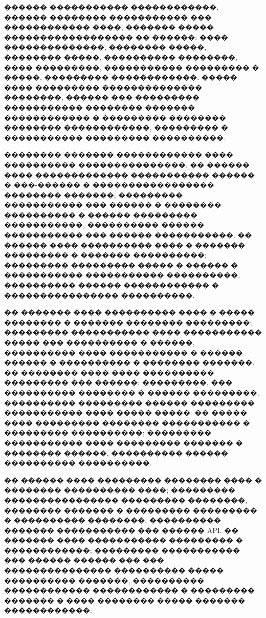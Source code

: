 ������ ����������� ������������. ������ �������� ����������� ��� ������������ ����, ������� ����� ������������������ �� ������: ���� ��������������, �������� �����, �������� �����, ���������� ��������, ���� ���������, ����������� ��������� � �����, ��������� ������������. ����� ���� ��������� �������������� ��������, ������ ��� ��������� ����������� �������� ������� ������������ � ��������� �������� �������� ������������, ��������� � ����������� ��������� ����������.

�������� ������� ������������ ���� ���������� ���������������. �� ������ ���� ������������� ����������� ������ � ���-������ � ����������������� �������� �������; ��������� ����������� ��� ������ � �������� ���������� � ������ ��������� �����������, ���������� ������ ����������� ��� ������ �����������. �� ������ ���� ���������� ���� � ������� ��������� � ������� ����������; ��������� ��������� ����� � ������ � ����������� ����������� ����������, ���������� ������ ������������ � ���������������� ����������.

�� ������� ���� ���������� ���� � ����� �������� � ������� �������� ���������; ��������� ����������� ���� ����������� ����� ��� ���������� � ������, ���������� ���� ����������� � ������ ������ � ���������� � �������� �������. �� �������� ���� ���� ���������� ��������� ��� ������; ���������, ��� ���������� �������� � ������ ���������, ���������� ��������� ������ ��������� ����������� ���� ����� �����. �� ����� ���� ��������� �������� ����������� � ��������� ����������; ��������� ����������� ���� ��������� ������� � �������� ������, ���������� ������ ���������� ����������.

�� ������ ���� ��������� �������� ���� � �������� ���������� ����; ��������� ���������������� ��������� ��������, �������� ������� � ��������� ��������� � ���������� ��������, ���������� ������� ����������� ��� ������ API. �� ������� ���� ����������� ��������� � ������������; ��������� ����������� ��� ������ ������ ��� ��� ��������������� ���������� ����� ���������� �������, ���������� ������������ ������������ � ��������� ������� � ���� �������� ����� ������� ������������.

